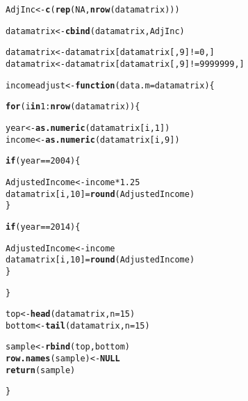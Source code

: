 \documentclass{article}\usepackage[]{graphicx}\usepackage[]{color}
\makeatletter
\newcommand{\hlnum}[1]{\textcolor[rgb]{0.686,0.059,0.569}{#1}}%
\newcommand{\hlopt}[1]{\textcolor[rgb]{0,0,0}{#1}}%
\newcommand{\hlstd}[1]{\textcolor[rgb]{0.345,0.345,0.345}{#1}}%
\newcommand{\hlkwa}[1]{\textcolor[rgb]{0.161,0.373,0.58}{\textbf{#1}}}%
\newcommand{\hlkwb}[1]{\textcolor[rgb]{0.69,0.353,0.396}{#1}}%
\newcommand{\hlkwc}[1]{\textcolor[rgb]{0.333,0.667,0.333}{#1}}%
\newcommand{\hlkwd}[1]{\textcolor[rgb]{0.737,0.353,0.396}{\textbf{#1}}}%
\newenvironment{kframe}{%
 \def\at@end@of@kframe{}%
 \ifinner\ifhmode%
  \def\at@end@of@kframe{\end{minipage}}%
  \begin{minipage}{\columnwidth}%
 \fi\fi%
 \def\FrameCommand##1{\hskip\@totalleftmargin \hskip-\fboxsep
 \colorbox{shadecolor}{##1}\hskip-\fboxsep
     \hskip-\linewidth \hskip-\@totalleftmargin \hskip\columnwidth}%
 \MakeFramed {\advance\hsize-\width
   \@totalleftmargin\z@ \linewidth\hsize
   \@setminipage}}%
 {\par\unskip\endMakeFramed%
 \at@end@of@kframe}
\newenvironment{knitrout}{}{} %
\makeatother
\begin{document}
\begin{knitrout}
\begin{kframe}
\begin{alltt}
\hlstd{AdjInc} \hlkwb{<-} \hlkwd{c}\hlstd{(}\hlkwd{rep}\hlstd{(}\hlnum{NA}\hlstd{,} \hlkwd{nrow}\hlstd{(datamatrix)))}

\hlstd{datamatrix} \hlkwb{<-} \hlkwd{cbind}\hlstd{(datamatrix, AdjInc)}

\hlstd{datamatrix} \hlkwb{<-} \hlstd{datamatrix[datamatrix[,}\hlnum{9}\hlstd{]}\hlopt{!=} \hlnum{0}\hlstd{,]}
\hlstd{datamatrix} \hlkwb{<-} \hlstd{datamatrix[datamatrix[,}\hlnum{9}\hlstd{]}\hlopt{!=} \hlnum{9999999}\hlstd{,]}



\hlstd{incomeadjust} \hlkwb{<-} \hlkwa{function}\hlstd{(}\hlkwc{data.m} \hlstd{= datamatrix)\{}

  \hlkwa{for} \hlstd{(i} \hlkwa{in} \hlnum{1}\hlopt{:}\hlkwd{nrow}\hlstd{(datamatrix))\{}

    \hlstd{year} \hlkwb{<-} \hlkwd{as.numeric}\hlstd{(datamatrix[i,}\hlnum{1}\hlstd{])}
    \hlstd{income} \hlkwb{<-} \hlkwd{as.numeric}\hlstd{(datamatrix[i,}\hlnum{9}\hlstd{])}

    \hlkwa{if} \hlstd{(year} \hlopt{==} \hlnum{2004}\hlstd{)\{}

      \hlstd{AdjustedIncome} \hlkwb{<-} \hlstd{income} \hlopt{*} \hlnum{1.25}
      \hlstd{datamatrix[i,}\hlnum{10}\hlstd{]} \hlkwb{=} \hlkwd{round}\hlstd{(AdjustedIncome)}
    \hlstd{\}}

    \hlkwa{if} \hlstd{(year} \hlopt{==} \hlnum{2014}\hlstd{)\{}

      \hlstd{AdjustedIncome} \hlkwb{<-} \hlstd{income}
      \hlstd{datamatrix[i,}\hlnum{10}\hlstd{]} \hlkwb{=} \hlkwd{round}\hlstd{(AdjustedIncome)}
    \hlstd{\}}


  \hlstd{\}}


  \hlstd{top} \hlkwb{<-} \hlkwd{head}\hlstd{(datamatrix,} \hlkwc{n}\hlstd{=}\hlnum{15}\hlstd{)}
  \hlstd{bottom}\hlkwb{<-} \hlkwd{tail}\hlstd{(datamatrix,} \hlkwc{n}\hlstd{=}\hlnum{15}\hlstd{)}

  \hlstd{sample} \hlkwb{<-} \hlkwd{rbind}\hlstd{(top,bottom)}
  \hlkwd{row.names}\hlstd{(sample)} \hlkwb{<-} \hlkwa{NULL}
  \hlkwd{return}\hlstd{(sample)}

\hlstd{\}}


\end{alltt}
\end{kframe}
\end{knitrout}
\end{document}
